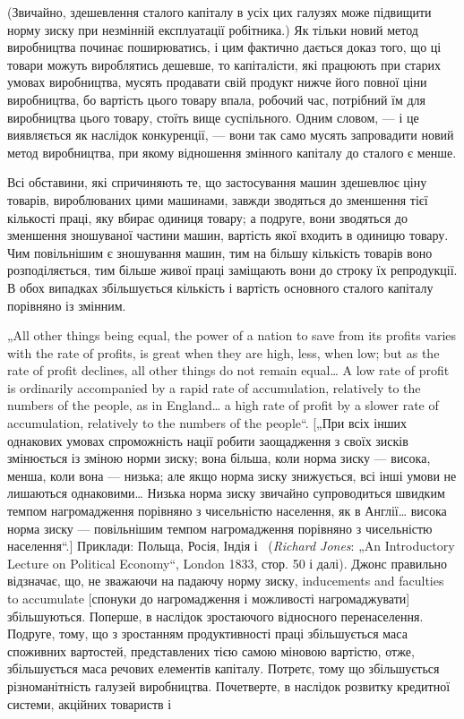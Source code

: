 \parcont{}  %
(Звичайно, здешевлення сталого капіталу в усіх цих галузях
може підвищити норму зиску при незмінній експлуатації робітника.)
Як тільки новий метод виробництва починає поширюватись,
і цим фактично дається доказ того, що ці товари можуть
вироблятись дешевше, то капіталісти, які працюють при старих
умовах виробництва, мусять продавати свій продукт нижче
його повної ціни виробництва, бо вартість цього товару впала,
робочий час, потрібний їм для виробництва цього товару, стоїть
вище суспільного. Одним словом, — і це виявляється як наслідок
конкуренції, — вони так само мусять запровадити новий метод
виробництва, при якому відношення змінного капіталу до
сталого є менше.

Всі обставини, які спричиняють те, що застосування машин
здешевлює ціну товарів, вироблюваних цими машинами,
завжди зводяться до зменшення тієї кількості праці, яку вбирає
одиниця товару; а подруге, вони зводяться до зменшення
зношуваної частини машин, вартість якої входить в одиницю
товару. Чим повільнішим є зношування машин, тим на більшу
кількість товарів воно розподіляється, тим більше живої праці
заміщають вони до строку їх репродукції. В обох випадках
збільшується кількість і вартість основного сталого капіталу
порівняно із змінним.

„All other things being equal, the power of a nation to save from
its profits varies with the rate of profits, is great when they are high,
less, when low; but as the rate of profit declines, all other things do
not remain equal\dots{} A low rate of profit is ordinarily accompanied by
a rapid rate of accumulation, relatively to the numbers of the people,
as in England\dots{} a high rate of profit by a slower rate of accumulation,
relatively to the numbers of the people“. [„При всіх інших
однакових умовах спроможність нації робити заощадження з своїх
зисків змінюється із зміною норми зиску; вона більша, коли
норма зиску — висока, менша, коли вона — низька; але якщо
норма зиску знижується, всі інші умови не лишаються однаковими\dots{}
Низька норма зиску звичайно супроводиться швидким
темпом нагромадження порівняно з чисельністю населення,
як в Англії\dots{} висока норма зиску — повільнішим темпом нагромадження
порівняно з чисельністю населення“.] Приклади: Польща,
Росія, Індія і~ (\emph{Richard Jones}: „An Introductory Lecture on Political
Economy“, London 1833, стор. 50 і далі). Джонс правильно відзначає,
що, не зважаючи на падаючу норму зиску, inducements
and faculties to accumulate [спонуки до нагромадження і можливості
нагромаджувати] збільшуються. Поперше, в наслідок зростаючого
відносного перенаселення. Подруге, тому, що з зростанням
продуктивності праці збільшується маса споживних вартостей,
представлених тією самою міновою вартістю, отже, збільшується
маса речових елементів капіталу. Потретє, тому що
збільшується різноманітність галузей виробництва. Почетверте,
в наслідок розвитку кредитної системи, акційних товариств і~
\parbreak{}  %
